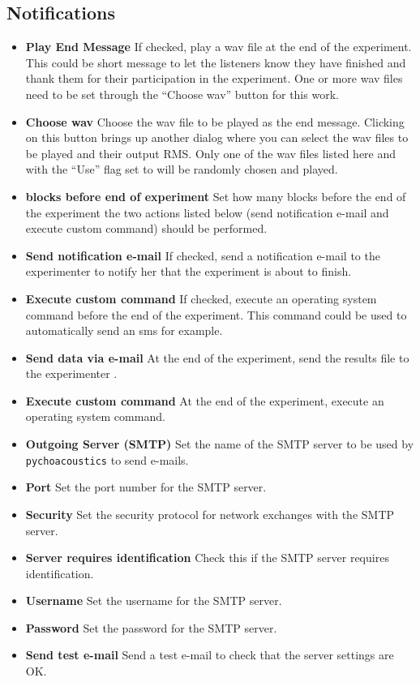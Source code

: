 \subsection{Notifications}
\label{sec:pref_dialog_notify}
\begin{itemize}
\item \textbf{Play End Message} If checked, play a wav file at the end of the experiment.
  This could be short message to let the listeners know they have finished and thank them
  for their participation in the experiment. One or more wav files need to be set through
  the ``Choose wav'' button for this work.
\item \textbf{Choose wav} Choose the wav file to be played as the end message. Clicking on this button 
  brings up another dialog where you can select the wav files to be played and their output RMS.
  Only one of the wav files listed here and with the ``Use'' flag set to  will be randomly chosen
  and played.
\item \textbf{blocks before end of experiment} Set how many blocks before the end of the experiment
  the two actions listed below (send notification e-mail and execute custom command) should be performed.
\item \textbf{Send notification e-mail} If checked, send a notification e-mail to the experimenter
  to notify her that the experiment is about to finish.
\item \textbf{Execute custom command} If checked, execute an operating system command before the end
  of the experiment. This command could be used to automatically send an sms for example.
\item \textbf{Send data via e-mail} At the end of the experiment, send the results file to the experimenter .
\item \textbf{Execute custom command} At the end of the experiment, execute an operating system command.
\item \textbf{Outgoing Server (SMTP)} Set the name of the SMTP server to be used by \texttt{pychoacoustics} to send e-mails.
\item \textbf{Port} Set the port number for the SMTP server.
\item \textbf{Security} Set the security protocol for network exchanges with the SMTP server.
\item \textbf{Server requires identification} Check this if the SMTP server requires identification.
\item \textbf{Username} Set the username for the SMTP server.
\item \textbf{Password} Set the password for the SMTP server.
\item \textbf{Send test e-mail} Send a test e-mail to check that the server settings are OK.
\end{itemize}

